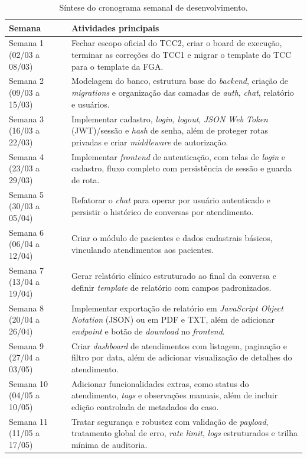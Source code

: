 \begin{apendicesenv}
\begin{table}[htb]
\centering
\caption{Síntese do cronograma semanal de desenvolvimento.}
\label{tab:cronograma-semanal}
\begin{tabularx}{\textwidth}{p{3.7cm}X}
\hline
Semana & Atividades principais \\
\hline
Semana 1 (02/03 a 08/03) & Fechar escopo oficial do TCC2, criar o board de execução, terminar as correções do TCC1 e migrar o template do TCC para o template da FGA. \\
Semana 2 (09/03 a 15/03) & Modelagem do banco, estrutura base do \textit{backend}, criação de \textit{migrations} e organização das camadas de \textit{auth}, \textit{chat}, relatório e usuários. \\
Semana 3 (16/03 a 22/03) & Implementar cadastro, \textit{login}, \textit{logout}, \textit{JSON Web Token} (JWT)/sessão e \textit{hash} de senha, além de proteger rotas privadas e criar \textit{middleware} de autorização. \\
Semana 4 (23/03 a 29/03) & Implementar \textit{frontend} de autenticação, com telas de \textit{login} e cadastro, fluxo completo com persistência de sessão e guarda de rota. \\
Semana 5 (30/03 a 05/04) & Refatorar o \textit{chat} para operar por usuário autenticado e persistir o histórico de conversas por atendimento. \\
Semana 6 (06/04 a 12/04) & Criar o módulo de pacientes e dados cadastrais básicos, vinculando atendimentos aos pacientes. \\
Semana 7 (13/04 a 19/04) & Gerar relatório clínico estruturado ao final da conversa e definir \textit{template} de relatório com campos padronizados. \\
Semana 8 (20/04 a 26/04) & Implementar exportação de relatório em \textit{JavaScript Object Notation} (JSON) ou em PDF e TXT, além de adicionar \textit{endpoint} e botão de \textit{download} no \textit{frontend}. \\
Semana 9 (27/04 a 03/05) & Criar \textit{dashboard} de atendimentos com listagem, paginação e filtro por data, além de adicionar visualização de detalhes do atendimento. \\
Semana 10 (04/05 a 10/05) & Adicionar funcionalidades extras, como status do atendimento, \textit{tags} e observações manuais, além de incluir edição controlada de metadados do caso. \\
Semana 11 (11/05 a 17/05) & Tratar segurança e robustez com validação de \textit{payload}, tratamento global de erro, \textit{rate limit}, \textit{logs} estruturados e trilha mínima de auditoria. \\

\end{tabularx}
\end{table}
\end{apendicesenv}
